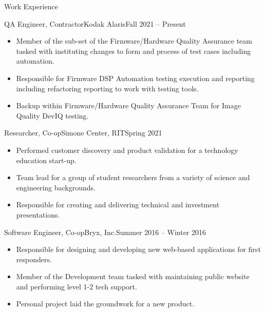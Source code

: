 \documentclass[]{mcdowellcv}
\begin{document}
	\makeheader
	
	\begin{cvsection}{Work Experience}
		\begin{cvsubsection}{QA Engineer, Contractor}{Kodak Alaris}{Fall 2021 -- Present}
				
			\begin{itemize}
				\item Member of the sub-set of the Firmware/Hardware Quality Assurance team tasked with instituting changes to form and process of test cases including automation.
				\item Responsible for Firmware DSP Automation testing execution and reporting including refactoring reporting to work with testing tools.
				\item Backup within Firmware/Hardware Quality Assurance Team for Image Quality DevIQ testing.
			\end{itemize}
		\end{cvsubsection}
			
		\begin{cvsubsection}{Researcher, Co-op}{Simone Center, RIT}{Spring 2021}
				
			\begin{itemize}
				\item Performed customer discovery and product validation for a technology education start-up.
				\item Team lead for a group of student researchers from a variety of science and engineering backgrounds.
				\item Responsible for creating and delivering technical and investment presentations.
			\end{itemize}
		\end{cvsubsection}
		
		\begin{cvsubsection}{Software Engineer, Co-op}{Bryx, Inc.}{Summer 2016 -- Winter 2016}	
			\begin{itemize}
				\item Responsible for designing and developing new web-based applications for first responders.
				\item Member of the Development team tasked with maintaining public website and performing level 1-2 tech support.
				\item Personal project laid the groundwork for a new product.
			\end{itemize}
		\end{cvsubsection}
		

\end{cvsection}
\end{document}
